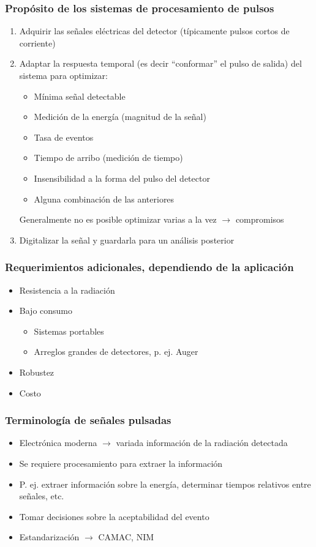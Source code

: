 \documentclass{beamer}
\begin{document}
\begin{frame}
\frametitle{Propósito de los sistemas de procesamiento de pulsos}
\begin{alertblock}{}
\begin{enumerate}
\item Adquirir las señales eléctricas del detector ({\color[rgb]{0,0,1}típicamente pulsos
cortos de corriente})
\item Adaptar la respuesta temporal (es decir ``{\color{violet}conformar}'' el pulso de salida) del sistema para optimizar:
\begin{itemize}
\item Mínima señal detectable
\item Medición de la energía (magnitud de la señal)
\item Tasa de eventos
\item Tiempo de arribo (medición de tiempo)
\item Insensibilidad a la forma del pulso del detector
\item Alguna combinación de las anteriores
\end{itemize}
\alert{Generalmente no es posible optimizar varias a la vez $\rightarrow$
{\color{blue} compromisos}}
\item Digitalizar la señal y guardarla para un análisis posterior
\end{enumerate}
\end{alertblock}
\end{frame} 

\begin{frame}
\frametitle{Requerimientos adicionales, dependiendo de la aplicación}
\begin{block}{}
\begin{itemize}
\item Resistencia a la radiación
\item Bajo consumo
\begin{itemize}
\item Sistemas portables
\item Arreglos grandes de detectores, p. ej. Auger
\end{itemize}
\item Robustez
\item Costo
\end{itemize}
\end{block}
\end{frame} 

\begin{frame}
\frametitle{Terminología de señales pulsadas}
\begin{itemize}
\item Electrónica moderna $\rightarrow$ variada información de la radiación
detectada
\item Se requiere procesamiento para extraer la información
\item P. ej. extraer información sobre la energía, determinar tiempos relativos
entre señales, etc.
\item Tomar decisiones sobre la \alert{aceptabilidad} del evento
\item Estandarización $\rightarrow$ CAMAC, NIM
\end{itemize}
\end{frame} 
\end{document}
